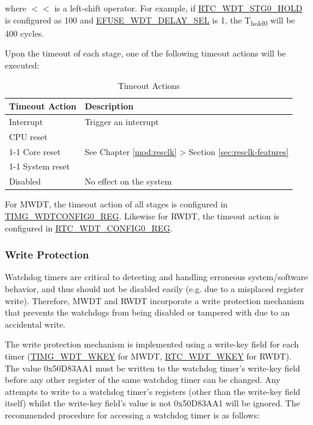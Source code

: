 \documentclass[main\_\_EN.tex]{subfiles}
\begin{document}
where $<<$ is a left-shift operator. For example, if \hyperref[fielddesc:RTCWDTSTG0HOLD]{RTC\_WDT\_STG0\_HOLD} is configured as 100 and \hyperref[fielddesc:EFUSEWDTDELAYSEL]{EFUSE\_WDT\_DELAY\_SEL} is 1, the T\textsubscript{hold0} will be 400 cycles.

Upon the timeout of each stage, one of the following timeout actions will be executed:

\begin{table}[H]
\centering
\caption{Timeout Actions}
\label{tab:wdt-timeout-action}

\begin{tabular}{|l|m{12cm}|}
\hline
\rowcolor{lightgray}
    \textbf{Timeout Action} & \textbf{Description} \\\hline

    Interrupt &  Trigger an interrupt \\ \hline
    CPU reset &  \multirow{3}{=}{See Chapter \ref{mod:resclk} \textit{\nameref{mod:resclk}} > Section \ref{sec:resclk-features} \textit{\nameref{sec:resclk-features}}}\\ \cline{1-1}
    Core reset &  \\ \cline{1-1}
    System reset &    \\ \hline
    Disabled &  No effect on the system \\ \hline

\end{tabular}
\end{table}

For MWDT, the timeout action of all stages is configured in \hyperref[regdesc:TIMGWDTCONFIG0REG]{TIMG\_WDTCONFIG0\_REG}. Likewise for RWDT, the timeout action is configured in \hyperref[regdesc:RTCWDTCONFIG0REG]{RTC\_WDT\_CONFIG0\_REG}.

\subsubsection{Write Protection}
Watchdog timers are critical to detecting and handling erroneous system/software behavior, and thus should not be disabled easily (e.g. due to a misplaced register write). Therefore, MWDT and RWDT incorporate a write protection mechanism that prevents the watchdogs from being disabled or tampered with due to an accidental write.

The write protection mechanism is implemented using a write-key field for each timer (\hyperref[fielddesc:TIMGWDTWKEY]{TIMG\_WDT\_WKEY} for MWDT, \hyperref[fielddesc:RTCWDTWKEY]{RTC\_WDT\_WKEY} for RWDT). The value 0x50D83AA1 must be written to the watchdog timer’s write-key field before any other register of the same watchdog timer can be changed. Any attempts to write to a watchdog timer’s registers (other than the write-key field itself) whilst the write-key field’s value is not 0x50D83AA1 will be ignored. The recommended procedure for accessing a watchdog timer is as follows:
\end{document}
